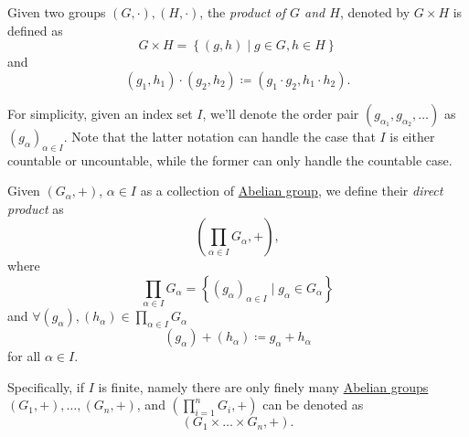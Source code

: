 \begin{definition}\label{def:product-of-groups}
	Given two groups \((G, \cdot), (H, \cdot)\), the \emph{product of \(G\) and \(H\)}, denoted by \(G\times H\) is defined as
	\[
		G\times H = \left\{(g, h)\mid g\in G, h\in H\right\}
	\]
	and
	\[
		(g_1, h_1)\cdot (g_2, h_2)\coloneqq (g_1\cdot g_2, h_1\cdot h_2).
	\]
\end{definition}

\begin{notation}
	For simplicity, given an index set \(I\), we'll denote the order pair \((g_{\alpha _1}, g_{\alpha _2}, \ldots)\) as \((g_\alpha )_{\alpha \in I}\). Note that
	the latter notation can handle the case that \(I\) is either countable or uncountable, while the former can only handle the countable case.
\end{notation}

\begin{definition}\label{def:direct-product}
	Given \((G_\alpha , +)\), \(\alpha \in I\) as a collection of \hyperref[def:Abelian-group]{Abelian group}, we define their \emph{direct product} as
	\[
		\left(\prod\limits_{\alpha \in I}G_\alpha , + \right),
	\]
	where
	\[
		\prod\limits_{\alpha \in I} G_\alpha = \left\{(g_\alpha )_{\alpha \in I}\mid g_\alpha \in G_\alpha \right\}
	\]
	and \(\forall (g_\alpha ), (h_\alpha )\in \prod\limits_{\alpha \in I} G_\alpha \)
	\[
		(g_\alpha )+(h_\alpha ) \coloneqq g_\alpha + h_\alpha
	\]
	for all \(\alpha \in I\).

	Specifically, if \(I\) is finite, namely there are only finely many \hyperref[def:Abelian-group]{Abelian groups} \((G_1, +),\ldots , (G_n, +)\), and
	\(\left(\prod\limits_{i=1}^{n} G_{i} , +\right)\) can be denoted as
	\[
		\left(G_1 \times \ldots \times G_n, + \right).
	\]
\end{definition}

